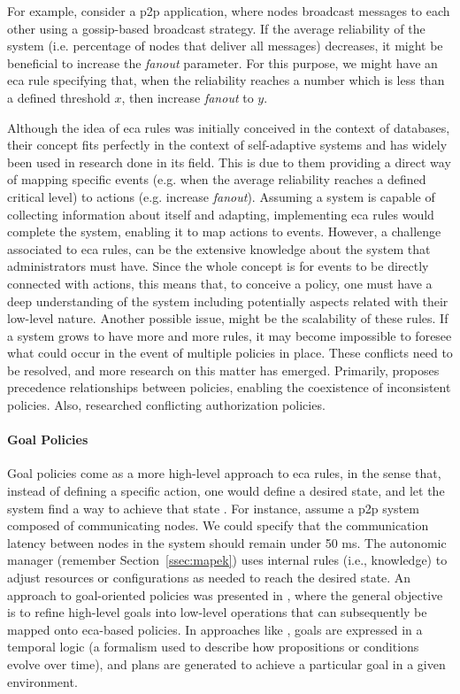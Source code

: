 For example, consider a \gls{p2p} application, where nodes broadcast messages to each other using a gossip-based broadcast strategy. If the average reliability of the system (i.e. percentage of nodes that deliver all messages) decreases, it might be beneficial to increase the \textit{fanout} parameter. For this purpose, we might have an \gls{eca} rule specifying that, when the reliability reaches a number which is less than a defined threshold $x$, then increase \textit{fanout} to $y$.

Although the idea of \gls{eca} rules was initially conceived in the context of databases, their concept fits perfectly in the context of self-adaptive systems and has widely been used in research done in its field. This is due to them providing a direct way of mapping specific events (e.g. when the average reliability reaches a defined critical level) to actions (e.g. increase \textit{fanout}). Assuming a system is capable of collecting information about itself and adapting, implementing \gls{eca} rules would complete the system, enabling it to map actions to events. However, a challenge associated to \gls{eca} rules, can be the extensive knowledge about the system that administrators must have. Since the whole concept is for events to be directly connected with actions, this means that, to conceive a policy, one must have a deep understanding of the system including potentially aspects related with their low-level nature. Another possible issue, might be the scalability of these rules. If a system grows to have more and more rules, it may become impossible to foresee what could occur in the event of multiple policies in place. These conflicts need to be resolved, and more research on this matter has emerged. Primarily, \cite{Lupu1999} proposes precedence relationships between policies, enabling the coexistence of inconsistent policies. Also, \cite{Kamoda2005} researched conflicting authorization policies.

\paragraph{Goal Policies} \label{par:goalpolicies} Goal policies come as a more high-level approach to \gls{eca} rules, in the sense that, instead of defining a specific action, one would define a desired state, and let the system find a way to achieve that state \cite{Huebscher2008}. For instance, assume a \gls{p2p} system composed of communicating nodes. We could specify that the communication latency between nodes in the system should remain under 50 ms. The autonomic manager (remember Section~\ref{ssec:mapek}) uses internal rules (i.e., knowledge) to adjust resources or configurations as needed to reach the desired state. An approach to goal-oriented policies was presented in \cite{Bandara2004}, where the general objective is to refine high-level goals into low-level operations that can subsequently be mapped onto \gls{eca}-based policies. In approaches like \cite{Sykes2008}, goals are expressed in a temporal logic (a formalism used to describe how propositions or conditions evolve over time), and plans are generated to achieve a particular goal in a given environment. 

